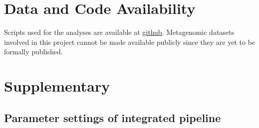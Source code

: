 \documentclass[11pt]{article}
\begin{document}


\section{Data and Code Availability}
Scripts used for the analyses are available at \href{https://github.com/CongLiu37/CMEECourseWork/tree/main/MResProject}{github}. 
Metagenomic datasets involved in this project cannot be made available publicly since they are yet to be formally published.

\newcommand{\beginsupplement}{%
        \setcounter{table}{0}
        \renewcommand{\thetable}{S\arabic{table}}%
        \setcounter{figure}{0}
        \renewcommand{\thefigure}{S\arabic{figure}}%
     }
\section{Supplementary}
  \beginsupplement
  \subsection{Parameter settings of integrated pipeline}
  \label{ParameterSetting}
\end{document}
